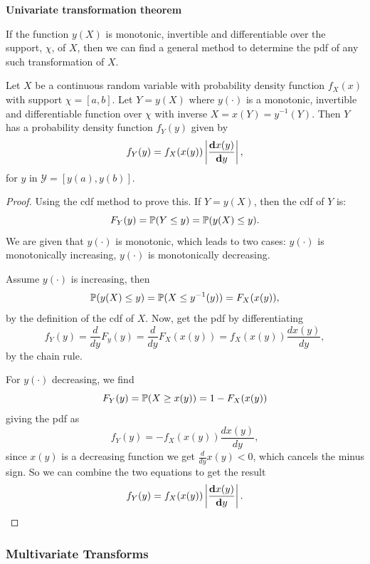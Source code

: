 \documentclass[10pt, a4paper]{article}
\begin{document}
\textbf{Univariate transformation theorem}

If the function $y(X)$ is monotonic,
invertible and differentiable over the support,
$\chi$,
of $X$,
then we can find a general method to determine the pdf of any such transformation of $X$.

\begin{theorem}
    Let $X$ be a continuous random variable with probability density function $f_X(x)$ with support $\chi = [a, b]$.
    Let $Y = y(X)$ where $y(\cdot)$ is a monotonic,
    invertible and differentiable function over $\chi$ with inverse $X = x(Y) = y ^ {-1}(Y)$.
    Then $Y$ has a probability density function $f_Y(y)$ given by
    \[
    f_Y(y) = f_X(x(y))\left|\frac{\mbf{d}x(y)}{\mbf{d}y}\right|,
    \]
    for $y$ in $\mathcal{Y} = [y(a), y(b)]$.

    \begin{proof}
        Using the cdf method to prove this.
        If $Y = y(X)$,
        then the cdf of $Y$ is:
        \[
        F_Y(y) = \P(Y \leq y) = \P(y(X) \leq y).
        \]
        We are given that $y(\cdot)$ is monotonic,
        which leads to two cases:
        $y(\cdot)$ is monotonically increasing,
        $y(\cdot)$ is monotonically decreasing.

        Assume $y(\cdot)$ is increasing,
        then
        \[
        \P(y(X) \leq y) = \P(X \leq y ^ {-1}(y)) = F_X(x(y)),
        \]
        by the definition of the cdf of $X$.
        Now,
        get the pdf by differentiating
        \[
        f_Y(y) = \frac{d}{dy}F_y(y) = \frac{d}{dy}F_X(x(y)) = f_X(x(y))\frac{dx(y)}{dy},
        \]
        by the chain rule.

        For $y(\cdot)$ decreasing,
        we find
        \[
        F_Y(y) = \P(X \geq x(y)) = 1 - F_X(x(y))
        \]
        giving the pdf as
        \[
        f_Y(y) = -f_X(x(y))\frac{dx(y)}{dy},
        \]
        since $x(y)$ is a decreasing function we get $\frac{d}{dy}x(y) < 0$,
        which cancels the minus sign.
        So we can combine the two equations to get the result
        \[
        f_Y(y) = f_X(x(y))\left|\frac{\mbf{d}x(y)}{\mbf{d}y}\right|.
        \]
    \end{proof}
\end{theorem}

\subsubsection{Multivariate Transforms}
\end{document}
